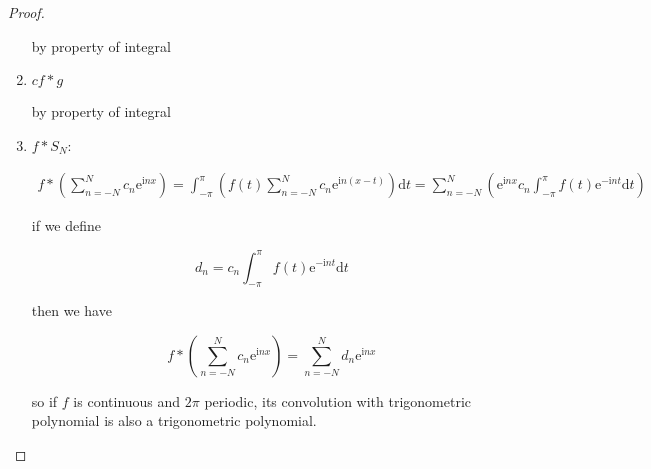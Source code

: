 \begin{proof}
\begin{enumerate}
        by property of integral

        \item $c f \ast g$

        by property of integral

        \item $f \ast S_N$:
    
        \begin{align*}
           f \ast \left(\sum_{n=-N}^{N} c_n\mathrm{e}^{\mathrm{i}nx} \right)  =\int_{-\pi}^{\pi} \left(f(t) \sum_{n=-N}^{N} c_n\mathrm{e}^{\mathrm{i}n(x-t)}\right) \mathrm{d}t = \sum_{n=-N}^{N}\left(\mathrm{e}^{\mathrm{i}nx}c_n\int_{-\pi}^{\pi} f(t) \mathrm{e}^{-\mathrm{i}nt} \mathrm{d}t \right) 
        \end{align*}

        if we define

        \[
            d_n = c_n\int_{-\pi}^{\pi} f(t) \mathrm{e}^{-\mathrm{i}nt} \mathrm{d}t 
        \]

        then we have

        \[
f \ast \left(\sum_{n=-N}^{N} c_n\mathrm{e}^{\mathrm{i}nx} \right) = \sum_{n=-N}^{N} d_n \mathrm{e}^{\mathrm{i}nx}
        \]

        so if $f$ is continuous and $2\pi $ periodic, its convolution with trigonometric polynomial is also a trigonometric polynomial.
    \end{enumerate}


\end{proof}

